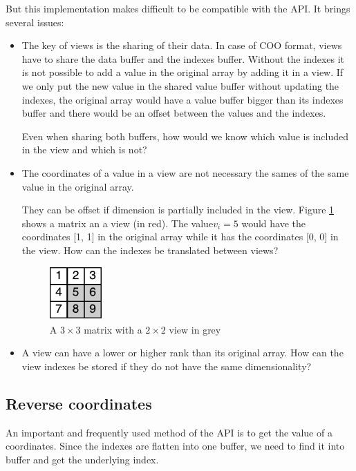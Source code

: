 But this implementation makes difficult to be compatible with the API. It brings several issues:
\begin{itemize}
	\item The key of views is the sharing of their data. In case of COO format, views have to share the data buffer and the indexes buffer. Without the indexes it is not possible to add a value in the original array by adding it in a view. If we only put the new value in the shared value buffer without updating the indexes, the original array would have a value buffer bigger than its indexes buffer and there would be an offset between the values and the indexes. 
	
	Even when sharing both buffers, how would we know which value is included in the view and which is not? 	
	
	\item The coordinates of a value in a view are not necessary the sames of the same value in the original array. 
		
	They can be offset if dimension is partially included in the view. Figure \ref{fig:viewOffset} shows a matrix an a view (in red). The value$ v_{i}=5$ would have the coordinates [1, 1] in the original array while it has the coordinates [0, 0] in the view. How can the indexes be translated between views?
	\begin{figure}[!h]
		\centering
		\includegraphics[width=0.8in]{images/viewIndexOffset.pdf}
		\caption{A $3\times 3$ matrix with a $2\times 2$ view in grey}
		\label{fig:viewOffset}
	\end{figure}

	\item A view can have a lower or higher rank than its original array. How can the view indexes be stored if they do not have the same dimensionality?
\end{itemize}

\subsection{Reverse coordinates}
\label{ssec:reverse}
An important and frequently used method of the API is to get the value of a coordinates. Since the indexes are flatten into one buffer, we need to find it into buffer and get the underlying index.

